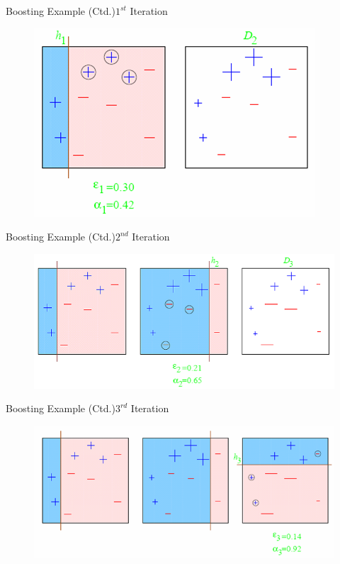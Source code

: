 \begin{frame}{Boosting Example (Ctd.)}{$1^{st}$ Iteration}
	\begin{figure}
		\includegraphics[scale=0.60]{08_decision_trees/02_img/boosting_first_iteration}
	\end{figure}
\end{frame}


\begin{frame}{Boosting Example (Ctd.)}{$2^{nd}$ Iteration}
	\begin{figure}
		\includegraphics[scale=0.60]{08_decision_trees/02_img/boosting_second_iteration}
	\end{figure}
\end{frame}


\begin{frame}{Boosting Example (Ctd.)}{$3^{rd}$ Iteration}
	\begin{figure}
		\includegraphics[scale=0.60]{08_decision_trees/02_img/boosting_third_iteration}
	\end{figure}
\end{frame}


